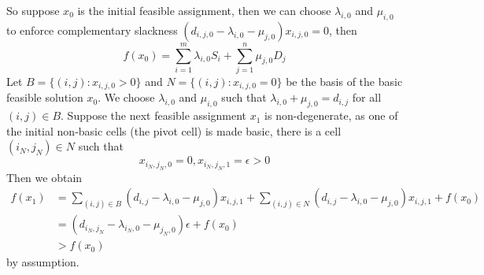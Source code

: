 So suppose $x_0$ is the initial feasible assignment, then we can choose $\lambda_{i,0}$ and $\mu_{i,0}$ to enforce complementary slackness $(d_{i,j,0}-\lambda_{i,0}-\mu_{j,0})x_{i,j,0}=0$, then
$$f(x_0)=\sum_{i=1}^m\lambda_{i,0}S_i+\sum_{j=1}^n\mu_{j,0}D_j$$
Let $B=\{(i,j):x_{i,j,0}>0\}$ and $N=\{(i,j):x_{i,j,0}=0\}$ be the basis of the basic feasible solution $x_0$.
We choose $\lambda_{i,0}$ and $\mu_{i,0}$ such that $\lambda_{i,0}+\mu_{j,0}=d_{i,j}$ for all $(i,j)\in B$.
Suppose the next feasible assignment $x_1$ is non-degenerate, as one of the initial non-basic cells (the pivot cell) is made basic, there is a cell $(i_N,j_N)\in N$ such that
$$x_{i_N,j_N,0}=0,x_{i_N,j_N,1}=\epsilon>0$$
Then we obtain
\begin{align*}
    f(x_1)&=\sum_{(i,j)\in B}(d_{i,j}-\lambda_{i,0}-\mu_{j,0})x_{i,j,1}+\sum_{(i,j)\in N}(d_{i,j}-\lambda_{i,0}-\mu_{j,0})x_{i,j,1}
    +f(x_0)\\
    &=(d_{i_N,j_N}-\lambda_{i_N,0}-\mu_{j_N,0})\epsilon+f(x_0)\\
    &>f(x_0)
\end{align*}
by assumption.